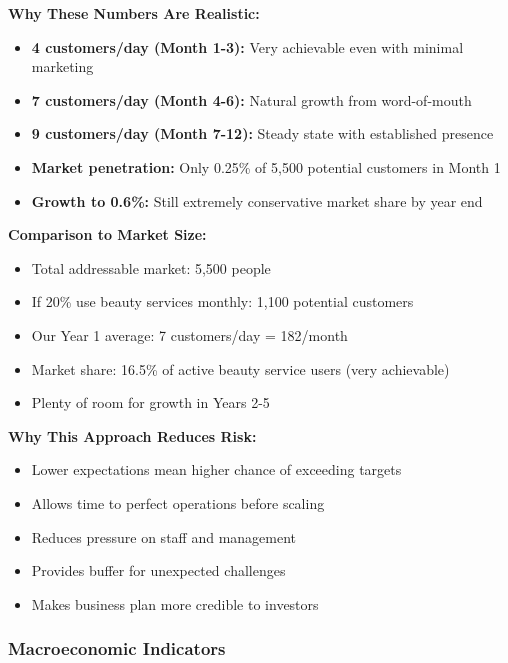 \begin{tcolorbox}[mybox, title=\textbf{Ultra-Conservative Assumptions Rationale}]
\textbf{Why These Numbers Are Realistic:}
\begin{itemize}[leftmargin=1em, itemsep=0pt]
    \item \textbf{4 customers/day (Month 1-3):} Very achievable even with minimal marketing
    \item \textbf{7 customers/day (Month 4-6):} Natural growth from word-of-mouth
    \item \textbf{9 customers/day (Month 7-12):} Steady state with established presence
    \item \textbf{Market penetration:} Only 0.25\% of 5,500 potential customers in Month 1
    \item \textbf{Growth to 0.6\%:} Still extremely conservative market share by year end
\end{itemize}

\textbf{Comparison to Market Size:}
\begin{itemize}[leftmargin=1em, itemsep=0pt]
    \item Total addressable market: 5,500 people
    \item If 20\% use beauty services monthly: 1,100 potential customers
    \item Our Year 1 average: 7 customers/day = 182/month
    \item Market share: 16.5\% of active beauty service users (very achievable)
    \item Plenty of room for growth in Years 2-5
\end{itemize}

\textbf{Why This Approach Reduces Risk:}
\begin{itemize}[leftmargin=1em, itemsep=0pt]
    \item Lower expectations mean higher chance of exceeding targets
    \item Allows time to perfect operations before scaling
    \item Reduces pressure on staff and management
    \item Provides buffer for unexpected challenges
    \item Makes business plan more credible to investors
\end{itemize}
\end{tcolorbox}

\subsubsection{Macroeconomic Indicators}

